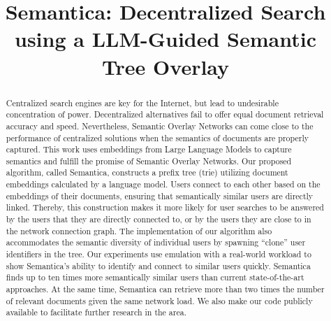 \documentclass[10pt,journal]{IEEEtran}
\begin{document}
\title{Semantica: Decentralized Search using a LLM-Guided Semantic Tree Overlay} %

\author{%


}

\maketitle

\begin{abstract}
Centralized search engines are key for the Internet, but lead to undesirable concentration of power.
Decentralized alternatives fail to offer equal document retrieval accuracy and speed.
Nevertheless, Semantic Overlay Networks can come close to the performance of centralized solutions when the semantics of documents are properly captured.
This work uses embeddings from Large Language Models to capture semantics and fulfill the promise of Semantic Overlay Networks.
Our proposed algorithm, called Semantica, constructs a prefix tree (trie) utilizing document embeddings calculated by a language model.
Users connect to each other based on the embeddings of their documents,  ensuring that semantically similar users are directly linked.
Thereby, this construction makes it more likely for user searches to be answered by the users that they are directly connected to, or by the users they are close to in the network connection graph.
The implementation of our algorithm also accommodates the semantic diversity of individual users by spawning ``clone'' user identifiers in the tree.
Our experiments use emulation with a real-world workload to show Semantica's ability to identify and connect to similar users quickly.
Semantica finds up to ten times more semantically similar users than current state-of-the-art approaches. At the same time, Semantica can retrieve more than two times the number of relevant documents given the same network load. We also make our code publicly available to facilitate further research in the area.
\end{abstract}
\end{document}
